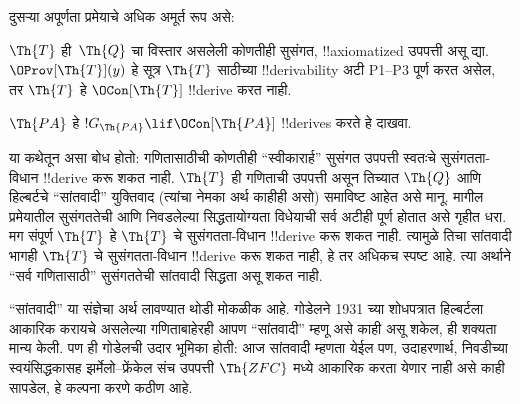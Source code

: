 \documentclass[../../../include/open-logic-section]{subfiles}
\begin{document}
दुसऱ्या अपूर्णता प्रमेयाचे
अधिक अमूर्त रूप असे:

\begin{thm}
$\Th{T}$ ही~$\Th{Q}$ चा
विस्तार असलेली कोणतीही
सुसंगत, !!{axiomatized}
उपपत्ती असू द्या.
$\OProv[\Th{T}](y)$
हे सूत्र $\Th{T}$
साठीच्या
!!{derivability} अटी
P1--P3 पूर्ण करत असेल,
तर $\Th{T}$ हे
$\OCon[\Th{T}]$
!!{derive} करत नाही.
\end{thm}

\begin{prob}
$\Th{PA}$ हे
$!G_{\Th{PA}} \lif \OCon[\Th{PA}]$
!!{derive}s करते हे
दाखवा.
\end{prob}

\begin{digress}
या कथेतून असा बोध होतो:
गणितासाठीची कोणतीही
“स्वीकारार्ह” सुसंगत
उपपत्ती स्वतःचे
सुसंगतता-विधान
!!{derive} करू शकत
नाही. $\Th{T}$ ही
गणिताची उपपत्ती असून
तिच्यात $\Th{Q}$ आणि
हिल्बर्टचे “सांतवादी”
युक्तिवाद (त्यांचा नेमका
अर्थ काहीही असो)
समाविष्ट आहेत असे
मानू. मागील प्रमेयातील सुसंगततेची आणि निवडलेल्या
सिद्धतायोग्यता विधेयाची सर्व अटीही पूर्ण होतात असे
गृहीत धरा. मग संपूर्ण
$\Th{T}$ हे
$\Th{T}$ चे
सुसंगतता-विधान
!!{derive} करू
शकत नाही. त्यामुळे
तिचा सांतवादी भागही
$\Th{T}$ चे
सुसंगतता-विधान
!!{derive} करू
शकत नाही, हे तर
अधिकच स्पष्ट आहे.
त्या अर्थाने
“सर्व गणितासाठी”
सुसंगततेची सांतवादी
सिद्धता असू शकत नाही.

“सांतवादी” या संज्ञेचा
अर्थ लावण्यात थोडी
मोकळीक आहे. गोडेलने
1931 च्या शोधपत्रात
हिल्बर्टला आकारिक
करायचे असलेल्या
गणिताबाहेरही आपण
“सांतवादी” म्हणू
असे काही असू शकेल,
ही शक्यता मान्य केली.
पण ही गोडेलची
उदार भूमिका होती:
आज सांतवादी म्हणता
येईल पण, उदाहरणार्थ,
निवडीच्या स्वयंसिद्धकासह
झर्मेलो--फ्रेंकेल संच
उपपत्ती $\Th{ZFC}$
मध्ये आकारिक करता
येणार नाही असे
काही सापडेल, हे
कल्पना करणे कठीण आहे.
\end{digress}
\end{document}
